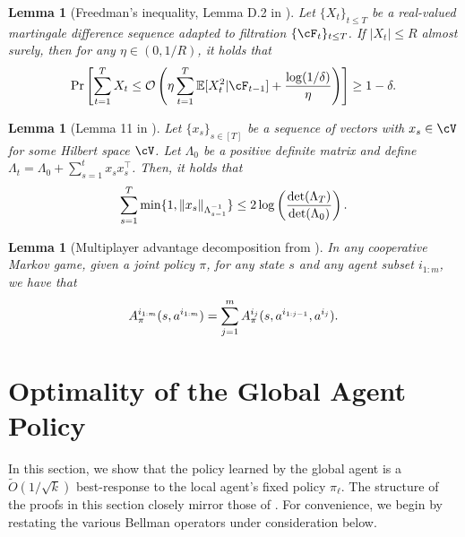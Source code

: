 \documentclass{article}
\theoremstyle{plain}
\newtheorem{lemma}[theorem]{Lemma}
\theoremstyle{definition}
\def\E{\mathbb{E}}
\begin{document}
\begin{lemma}[Freedman's inequality, Lemma D.2 in \citet{liu2023maximize}]
Let $\{X_t\}_{t\leq T}$ be a real-valued martingale difference sequence adapted to filtration $\{\cF_t\}_{t\leq T}$. If $|X_t|\leq R$ almost surely, then for any $\eta\in (0, 1/R)$, it holds that
\begin{equation}
    \Pr\left[\sum_{t=1}^T X_t \leq \mathcal{O}\left(\eta\sum_{t=1}^T \E[X_t^2|\cF_{t-1}] + \frac{\log(1/\delta)}{\eta}\right)\right]\geq 1-\delta.\\
\end{equation}
\end{lemma}

\begin{lemma}[Lemma 11 in \citet{abbasi2011improved}] Let $\{x_s\}_{s\in[T]}$ be a sequence of vectors with $x_s \in \cV$ for some Hilbert space $\cV$. Let $\Lambda_0$ be a positive definite matrix and define $\Lambda_t = \Lambda_0 + \sum_{s=1}^t x_s x_s^\top$. Then, it holds that
\begin{equation}\sum_{s=1}^T \min\{1,\|x_s\|_{\Lambda_{s-1}^{-1}}\} \leq 2\log\left (\frac{\det(\Lambda_T)}{\det(\Lambda_0)}\right).\\
\end{equation}
\end{lemma}

\begin{lemma}[Multiplayer advantage decomposition from \citet{zhong2024heterogeneous}] In any cooperative Markov game, given a joint policy $\pi$, for any state $s$ and any agent subset $i_{1:m}$, we have that 
\begin{equation}A_\pi^{i_{1:m}}(s,a^{i_{1:m}}) = \sum_{j=1}^m A_\pi^{i_j} (s, a^{i_{1:j-1}}, a^{i_j}).\\
\end{equation}
    
\end{lemma}



\section{Optimality of the Global Agent Policy}
\label{sec: optimality of global agent policy}

In this section, we show that the policy learned by the global agent is a $\tilde{O}(1/\sqrt{k})$ best-response to the local agent's fixed policy $\pi_\ell$.  The structure of the proofs in this section closely mirror those of \citet{anand2025meanfield}. For convenience, we begin by restating the various Bellman operators under consideration below.
\end{document}
